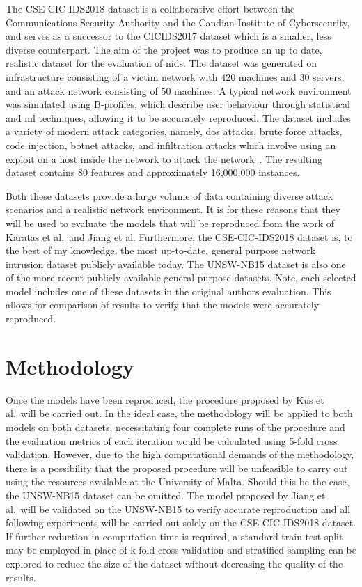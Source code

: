 The CSE-CIC-IDS2018 dataset is a collaborative effort between the
Communications Security Authority and the Candian Institute of Cybersecurity,
and serves as a successor to the CICIDS2017 dataset which is a smaller, less
diverse counterpart. The aim of the project was to produce an up to date,
realistic dataset for the evaluation of \gls{nids}. The dataset was generated
on infrastructure consisting of a victim network with 420 machines and 30
servers, and an attack network consisting of 50 machines. A typical network
environment was simulated using B-profiles, which describe user behaviour
through statistical and \gls{ml} techniques, allowing it to be accurately
reproduced. The dataset includes a variety of modern attack categories, namely,
\gls{dos} attacks, brute force attacks, code injection, botnet attacks, and
infiltration attacks which involve using an exploit on a host inside the
network to attack the network~\cite{}. The resulting dataset contains 80
features and approximately 16,000,000 instances.

Both these datasets provide a large volume of data containing diverse attack
scenarios and a realistic network environment. It is for these reasons that
they will be used to evaluate the models that will be reproduced from the work
of Karatas et al.\ and Jiang et al. Furthermore, the CSE-CIC-IDS2018 dataset
is, to the best of my knowledge, the most up-to-date, general purpose network
intrusion dataset publicly available today. The UNSW-NB15 dataset is also one
of the more recent publicly available general purpose datasets. Note, each
selected model includes one of these datasets in the original authors
evaluation. This allows for comparison of results to verify that the models
were accurately reproduced.

\section{Methodology}%
\label{sec:methodology}

Once the models have been reproduced, the procedure proposed by Kus et al.\
will be carried out. In the ideal case, the methodology will be applied to both
models on both datasets, necessitating four complete runs of the procedure and
the evaluation metrics of each iteration would be calculated using 5-fold cross
validation. However, due to the high computational demands of the methodology,
there is a possibility that the proposed procedure will be unfeasible to carry
out using the resources available at the University of Malta. Should this be
the case, the UNSW-NB15 dataset can be omitted. The model proposed by Jiang et
al.\ will be validated on the UNSW-NB15 to verify accurate reproduction and all
following experiments will be carried out solely on the CSE-CIC-IDS2018
dataset. If further reduction in computation time is required, a standard
train-test split may be employed in place of k-fold cross validation and
stratified sampling can be explored to reduce the size of the dataset without
decreasing the quality of the results.


